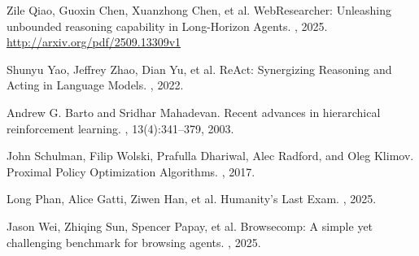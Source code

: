 \documentclass{article}
\begin{document}

\begin{thebibliography}{1}

Zile Qiao, Guoxin Chen, Xuanzhong Chen, et al.
\newblock WebResearcher: Unleashing unbounded reasoning capability in Long-Horizon Agents.
, 2025.
\newblock \href{http://arxiv.org/pdf/2509.13309v1}{http://arxiv.org/pdf/2509.13309v1}

Shunyu Yao, Jeffrey Zhao, Dian Yu, et al.
\newblock ReAct: Synergizing Reasoning and Acting in Language Models.
, 2022.

Andrew G. Barto and Sridhar Mahadevan.
\newblock Recent advances in hierarchical reinforcement learning.
, 13(4):341--379, 2003.

John Schulman, Filip Wolski, Prafulla Dhariwal, Alec Radford, and Oleg Klimov.
\newblock Proximal Policy Optimization Algorithms.
, 2017.

Long Phan, Alice Gatti, Ziwen Han, et al.
\newblock Humanity's Last Exam.
, 2025.

Jason Wei, Zhiqing Sun, Spencer Papay, et al.
\newblock Browsecomp: A simple yet challenging benchmark for browsing agents.
, 2025.

\end{thebibliography}
\end{document}
